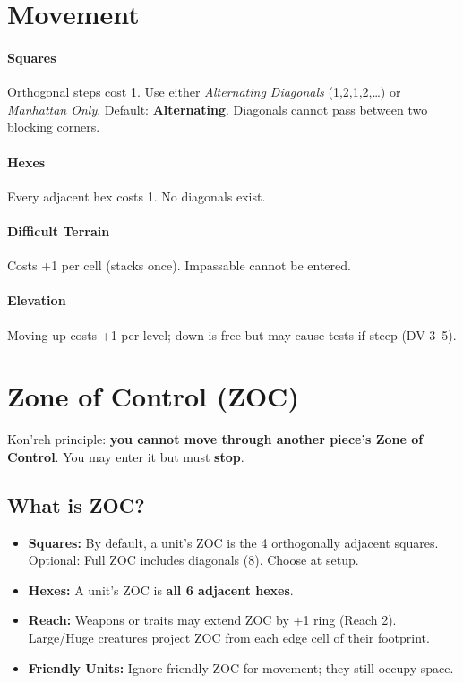 \documentclass[11pt]{article}
\newcommand{\DV}{\textsc{DV}}
\begin{document}
\section{Movement}
\paragraph{Squares} Orthogonal steps cost 1. Use either \emph{Alternating Diagonals} (1,2,1,2,…) or \emph{Manhattan Only}. Default: \textbf{Alternating}. Diagonals cannot pass between two blocking corners.

\paragraph{Hexes} Every adjacent hex costs 1. No diagonals exist.

\paragraph{Difficult Terrain} Costs +1 per cell (stacks once). Impassable cannot be entered.

\paragraph{Elevation} Moving up costs +1 per level; down is free but may cause tests if steep (\DV{} 3–5).

\section{Zone of Control (ZOC)}\label{sec:zoc}
Kon’reh principle: \textbf{you cannot move through another piece’s Zone of Control}. You may enter it but must \textbf{stop}.

\subsection{What is ZOC?}
\begin{itemize}
  \item \textbf{Squares:} By default, a unit’s ZOC is the 4 orthogonally adjacent squares. Optional: Full ZOC includes diagonals (8). Choose at setup.
  \item \textbf{Hexes:} A unit’s ZOC is \textbf{all 6 adjacent hexes}.
  \item \textbf{Reach:} Weapons or traits may extend ZOC by +1 ring (Reach 2). Large/Huge creatures project ZOC from each edge cell of their footprint.
  \item \textbf{Friendly Units:} Ignore friendly ZOC for movement; they still occupy space.
\end{itemize}
\end{document}
